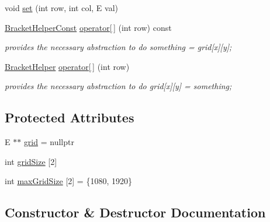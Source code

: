\begin{DoxyCompactItemize}
\item 
void \hyperlink{classbridges_1_1datastructure_1_1_grid_ac0d4784a31f69d8cf4be38952730cfa8}{set} (int row, int col, E val)
\item 
\hyperlink{classbridges_1_1datastructure_1_1_grid_1_1_bracket_helper_const}{Bracket\+Helper\+Const} \hyperlink{classbridges_1_1datastructure_1_1_grid_a754a890728b6b268a1ba843da89cb1f6}{operator\mbox{[}$\,$\mbox{]}} (int row) const
\begin{DoxyCompactList}\small\item\em provides the necessary abstraction to do something = grid\mbox{[}x\mbox{]}\mbox{[}y\mbox{]}; \end{DoxyCompactList}\item 
\hyperlink{classbridges_1_1datastructure_1_1_grid_1_1_bracket_helper}{Bracket\+Helper} \hyperlink{classbridges_1_1datastructure_1_1_grid_ae5a7cf159c7918193ba75146660c3c1f}{operator\mbox{[}$\,$\mbox{]}} (int row)
\begin{DoxyCompactList}\small\item\em provides the necessary abstraction to do grid\mbox{[}x\mbox{]}\mbox{[}y\mbox{]} = something; \end{DoxyCompactList}\end{DoxyCompactItemize}
\subsection*{Protected Attributes}
\begin{DoxyCompactItemize}
\item 
E $\ast$$\ast$ \hyperlink{classbridges_1_1datastructure_1_1_grid_aa29a07fad530eacd55e6244471ec4ecb}{grid} = nullptr
\item 
int \hyperlink{classbridges_1_1datastructure_1_1_grid_a97738e6230af3e7e593e93ecfde0b731}{grid\+Size} \mbox{[}2\mbox{]}
\item 
int \hyperlink{classbridges_1_1datastructure_1_1_grid_acb1cca7db5fb42a0b107885f9e00ff67}{max\+Grid\+Size} \mbox{[}2\mbox{]} = \{1080, 1920\}
\end{DoxyCompactItemize}


\subsection{Constructor \& Destructor Documentation}
\mbox{\label{classbridges_1_1datastructure_1_1_grid_a80d8bca9d3793d896a92168a54ce7b2b}} 
